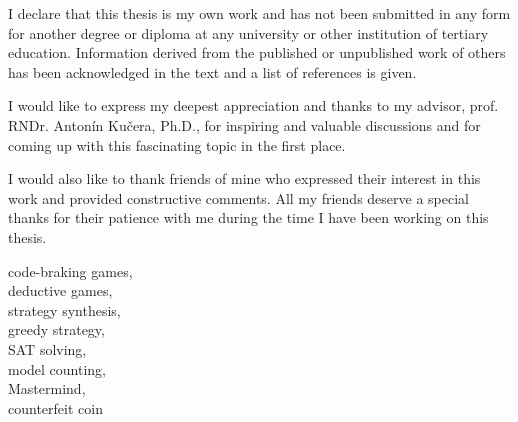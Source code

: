 

{}








\FrontMatter
\setlength{\parindent}{0pt}
\ThesisTitlePage


\begin{ThesisDeclaration}
I declare that this thesis is my own work and has not been submitted
in any form for another degree or diploma at any university or
other institution of tertiary education. Information derived from the published
or unpublished work of others has been acknowledged in the text
and a list of references is given.

\AdvisorName
\end{ThesisDeclaration}


\begin{ThesisThanks}
I would like to express my deepest appreciation and thanks to my advisor,
  prof. RNDr. Antonín Kučera, Ph.D.,
  for inspiring and valuable discussions and
  for coming up with this fascinating topic in the first place.

I would also like to thank friends of mine who
  expressed their interest in this work and provided
  constructive comments.
All my friends deserve a special thanks for their patience with me
 during the time I have been working on this thesis.
\end{ThesisThanks}


\begin{ThesisKeyWords}
code-braking games, \\
deductive games,\\
strategy synthesis, \\
greedy strategy,\\
SAT solving,\\
model counting, \\
Mastermind, \\
counterfeit coin\\
\end{ThesisKeyWords}


